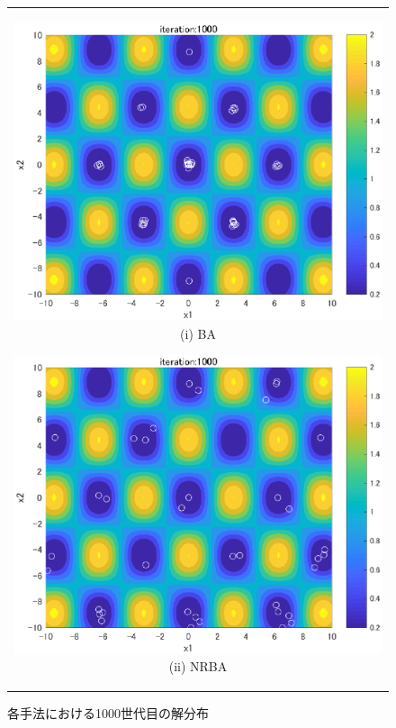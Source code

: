 \documentclass[twocolumn, a4paper]{UECIEresume}
\begin{document}
\begin{figure}[t]
\begin{center}
\begin{tabular}{c}
\begin{minipage}[b]{0.45\linewidth}
\begin{center}
\includegraphics[keepaspectratio, scale=0.33]{eps/ba1000.eps} (i) BA

\end{center}
\end{minipage}

\begin{minipage}[b]{0.45\linewidth}
\begin{center}
\includegraphics[keepaspectratio, scale=0.33]{eps/nrba1000.eps} (ii) NRBA
\end{center}
\end{minipage}
\end{tabular}
\caption{各手法における1000世代目の解分布}
\label{fig:1000}
\end{center}
\end{figure}
\end{document}
